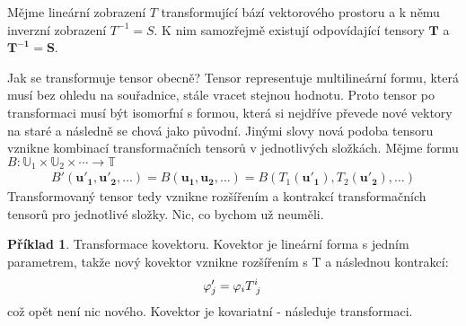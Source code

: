\documentclass[a5paper,12pt]{amsbook}
\theoremstyle{definition}
\newtheorem{example}{Příklad}[chapter]
\newcommand{\myvec}[1]{\bm{#1}}
\newcommand{\myspace}[1]{\mathbb{#1}}
\begin{document}
Mějme lineární zobrazení $T$ transformující bází vektorového prostoru a k němu
inverzní zobrazení $T^{-1} = S$. K nim samozřejmě existují odpovídající tensory
$\myvec{T}$ a $\myvec{T^{-1}} = \myvec{S}$.

Jak se transformuje tensor obecně? Tensor representuje multilineární formu,
která musí bez ohledu na souřadnice, stále vracet stejnou hodnotu. Proto
tensor po transformaci musí být isomorfní s formou, která si nejdříve převede
nové vektory na staré a následně se chová jako původní. Jinými slovy nová
podoba tensoru vznikne kombinací transformačních tensorů v jednotlivých
složkách. Mějme formu
$B: \myspace{U}_1\times\myspace{U}_2\times\cdots\rightarrow\myspace{T}$
\begin{equation*}
\begin{split}
B'(\myvec{u'_1}, \myvec{u'_2}, \dots) = B(\myvec{u_1}, \myvec{u_2}, \dots)
= B(T_1(\myvec{u'_1}), T_2(\myvec{u'_2}), \dots)
\end{split}
\end{equation*}
Transformovaný tensor tedy vznikne rozšířením a kontrakcí transformačních
tensorů pro jednotlivé složky. Nic, co bychom už neuměli.

\begin{example}
Transformace kovektoru. Kovektor je lineární forma
s jedním parametrem, takže nový kovektor vznikne rozšířením s T a následnou
kontrakcí:
\begin{equation*}
\begin{split}
\varphi'_j = \varphi_i T\indices{^i_j}
\end{split}
\end{equation*}
což opět není nic nového. Kovektor je kovariatní - následuje transformaci.

\end{example}
\end{document}
